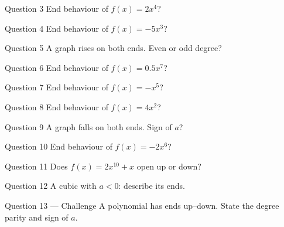 \documentclass[11pt]{article}
\begin{document}
\begin{qbox}{Question 3}
End behaviour of $f(x)=2x^4$?\workspace{2.4cm}
\end{qbox}

\begin{qbox}{Question 4}
End behaviour of $f(x)=-5x^3$?\workspace{2.4cm}
\end{qbox}

\begin{qbox}{Question 5}
A graph rises on both ends. Even or odd degree?\workspace{2.4cm}
\end{qbox}

\begin{qbox}{Question 6}
End behaviour of $f(x)=0.5x^7$?\workspace{2.4cm}
\end{qbox}

\begin{qbox}{Question 7}
End behaviour of $f(x)=-x^5$?\workspace{2.4cm}
\end{qbox}

\begin{qbox}{Question 8}
End behaviour of $f(x)=4x^2$?\workspace{2.4cm}
\end{qbox}

\begin{qbox}{Question 9}
A graph falls on both ends. Sign of $a$?\workspace{2.4cm}
\end{qbox}

\begin{qbox}{Question 10}
End behaviour of $f(x)=-2x^6$?\workspace{2.4cm}
\end{qbox}

\begin{qbox}{Question 11}
Does $f(x)=2x^{10}+x$ open up or down?\workspace{2.4cm}
\end{qbox}

\begin{qbox}{Question 12}
A cubic with $a<0$: describe its ends.\workspace{2.4cm}
\end{qbox}

\begin{qbox}{Question 13 --- Challenge}
A polynomial has ends up–down. State the degree parity and sign of $a$.\workspace{2.6cm}
\end{qbox}

\clearpage
{}
\end{document}

